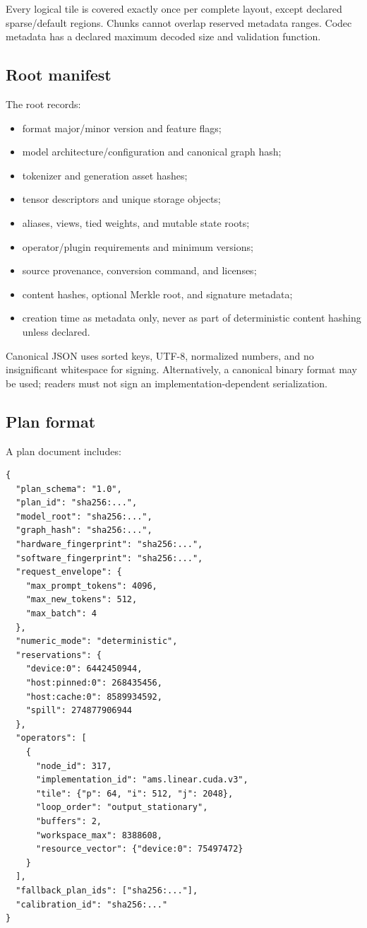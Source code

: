 Every logical tile is covered exactly once per complete layout, except declared sparse/default regions. Chunks cannot overlap reserved metadata ranges. Codec metadata has a declared maximum decoded size and validation function.

\subsection{Root manifest}

The root records:

\begin{itemize}
  \item format major/minor version and feature flags;
  \item model architecture/configuration and canonical graph hash;
  \item tokenizer and generation asset hashes;
  \item tensor descriptors and unique storage objects;
  \item aliases, views, tied weights, and mutable state roots;
  \item operator/plugin requirements and minimum versions;
  \item source provenance, conversion command, and licenses;
  \item content hashes, optional Merkle root, and signature metadata;
  \item creation time as metadata only, never as part of deterministic content hashing unless declared.
\end{itemize}

Canonical JSON uses sorted keys, UTF-8, normalized numbers, and no insignificant whitespace for signing. Alternatively, a canonical binary format may be used; readers must not sign an implementation-dependent serialization.

\subsection{Plan format}

A plan document includes:

\begin{lstlisting}[language={},caption={Abbreviated plan structure.}]
{
  "plan_schema": "1.0",
  "plan_id": "sha256:...",
  "model_root": "sha256:...",
  "graph_hash": "sha256:...",
  "hardware_fingerprint": "sha256:...",
  "software_fingerprint": "sha256:...",
  "request_envelope": {
    "max_prompt_tokens": 4096,
    "max_new_tokens": 512,
    "max_batch": 4
  },
  "numeric_mode": "deterministic",
  "reservations": {
    "device:0": 6442450944,
    "host:pinned:0": 268435456,
    "host:cache:0": 8589934592,
    "spill": 274877906944
  },
  "operators": [
    {
      "node_id": 317,
      "implementation_id": "ams.linear.cuda.v3",
      "tile": {"p": 64, "i": 512, "j": 2048},
      "loop_order": "output_stationary",
      "buffers": 2,
      "workspace_max": 8388608,
      "resource_vector": {"device:0": 75497472}
    }
  ],
  "fallback_plan_ids": ["sha256:..."],
  "calibration_id": "sha256:..."
}
\end{lstlisting}

